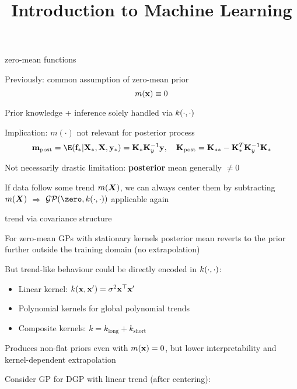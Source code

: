 \documentclass[11pt,compress,t,notes=noshow, xcolor=table]{beamer}
\title{Introduction to Machine Learning}
\begin{document}


\begin{framei}[sep=L]{zero-mean functions}
\item Previously: common assumption of zero-mean prior $$m(\mathbf{x}) \equiv 0$$
\item Prior knowledge + inference solely handled via $k(\cdot, \cdot)$
\item Implication: $m(\cdot)$ not relevant for posterior process
$$\mv_{\text{post}} = \E(\fs | \Xs, \Xmat, \ys) = \Ks \Ky^{-1} \yv, \quad \Kmat_{\text{post}} = \Kss - \Ks^T \Ky^{-1} \Ks$$
\item Not necessarily drastic limitation: \textbf{posterior} mean generally $\neq 0$
\item If data follow some trend $m(\bm{X})$, we can always center them by subtracting $m(\bm{X})$ $\Rightarrow$ $\GPzk$ applicable again
\end{framei}



\begin{framei}[sep=S]{trend via covariance structure}
\item For zero-mean GPs with stationary kernels posterior mean reverts to the prior further outside the training domain (no extrapolation)
\item But trend-like behaviour could be directly encoded in $k(\cdot, \cdot)$:
\begin{itemize}
  \item Linear kernel: $k(\mathbf{x},\mathbf{x}')=\sigma^2 \mathbf{x}^\top \mathbf{x}'$
  \item Polynomial kernels for global polynomial trends
  \item Composite kernels: $k = k_{\text{long}} + k_{\text{short}}$
\end{itemize}
\item Produces non-flat priors even with $m(\mathbf{x})=0$, but lower interpretability and kernel-dependent extrapolation
\item Consider GP for DGP with linear trend (after centering):

\vfill


\end{framei}
\end{document}
